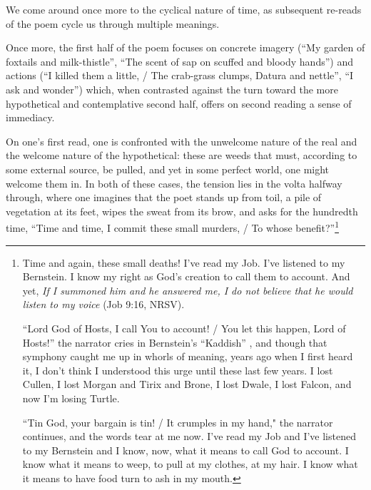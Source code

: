 \documentclass[12pt,oneside]{memoir}
\begin{document}
We come around once more to the cyclical nature of time, as subsequent re-reads of the poem cycle us through multiple meanings.

Once more, the first half of the poem focuses on concrete imagery (``My garden of foxtails and milk-thistle'', ``The scent of sap on scuffed and bloody hands'') and actions (``I killed them a little, / The crab-grass clumps, Datura and nettle'', ``I ask and wonder'') which, when contrasted against the turn toward the more hypothetical and contemplative second half, offers on second reading a sense of immediacy.

On one's first read, one is confronted with the unwelcome nature of the real and the welcome nature of the hypothetical: these are weeds that must, according to some external source, be pulled, and yet in some perfect world, one might welcome them in. In both of these cases, the tension lies in the volta halfway through, where one imagines that the poet stands up from toil, a pile of vegetation at its feet, wipes the sweat from its brow, and asks for the hundredth time, ``Time and time, I commit these small murders, / To whose benefit?''\footnote{Time and again, these small deaths! I've read my Job. I've listened to my Bernstein. I know my right as God's creation to call them to account. And yet, \emph{If I summoned him and he answered me, I do not believe that he would listen to my voice} (Job 9:16, NRSV).\par
``Lord God of Hosts, I call You to account! / You let this happen, Lord of Hosts!'' the narrator cries in Bernstein's ``Kaddish'' \parencite{kaddish}, and though that symphony caught me up in whorls of meaning, years ago when I first heard it, I don't think I understood this urge until these last few years. I lost Cullen, I lost Morgan and Tirix and Brone, I lost Dwale, I lost Falcon, and now I'm losing Turtle.\par
``Tin God, your bargain is tin! / It crumples in my hand," the narrator continues, and the words tear at me now. I've read my Job and I've listened to my Bernstein and I know, now, what it means to call God to account. I know what it means to weep, to pull at my clothes, at my hair. I know what it means to have food turn to ash in my mouth.}
\end{document}

